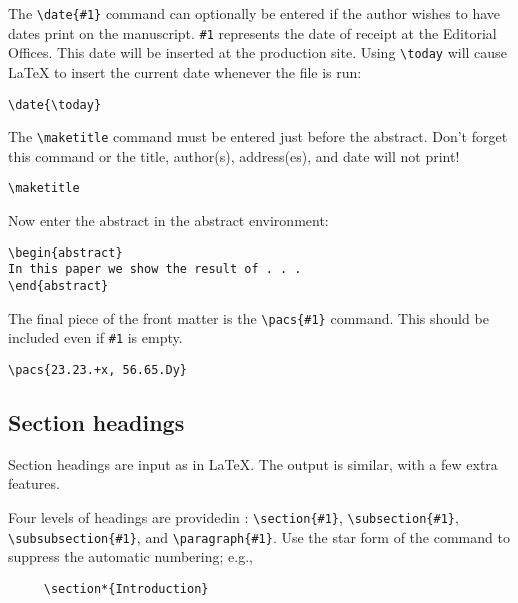 The \verb+\date{#1}+ command can optionally be entered if the author wishes
to have dates print on the manuscript. \verb+#1+ represents the date of
receipt at the Editorial Offices. This date will be inserted at the
production site. Using \verb+\today+ will cause \LaTeX{} to insert the
current date whenever the file is run:
\begin{verbatim}
\date{\today}
\end{verbatim}
The \verb+\maketitle+ command must be entered just before the abstract.
Don't forget this command or the title, author(s), address(es), and date
will not print!
\begin{verbatim}
\maketitle
\end{verbatim}
Now enter the abstract in the abstract environment:
\begin{verbatim}
\begin{abstract}
In this paper we show the result of . . .
\end{abstract}
\end{verbatim}
The final piece of the front matter is the \verb+\pacs{#1}+ command. This
should be included even if \verb+#1+ is empty.
\begin{verbatim}
\pacs{23.23.+x, 56.65.Dy}
\end{verbatim}

\subsection{Section headings}

Section headings are input as in \LaTeX. The output is similar, with a few
extra features.

Four levels of headings are provided\break in \REVTeX{}:
\verb+\section{#1}+, \verb+\subsection{#1}+, \verb+\subsubsection{#1}+, and
\verb+\paragraph{#1}+. Use the star form of the command to suppress the
automatic numbering; e.g.,
\begin{verbatim}
     \section*{Introduction}
\end{verbatim}

